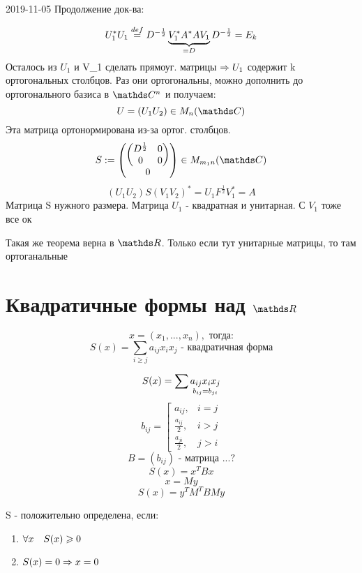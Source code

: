 \documentclass[12pt, fleqn]{article}
\begin{document}
\begin{lect}{2019-11-05}
  Продолжение док-ва:
  \begin{Proof}
    \[U_1^* U_1 \os{def}{=} D^{-\frac{1}{2}} \ub{=D}{V_1^* A^* A V_1} D^{-\frac{1}{2}} = E_k\]
    Осталось из $U_1$ и V_1 сделать прямоуг. матрицы $\Ra U_1$ содержит k ортогональных столбцов. Раз они ортогональны, можно дополнить до ортогонального базиса в $\CC^n$ и получаем:
    \[U=(U_1 U_2) \in M_n(\CC)\]
    Эта матрица ортонормирована из-за ортог. столбцов.
    \[S:=\begin{pmatrix}
    \begin{pmatrix}
      D^{\frac{1}{2}} & 0\\
      0 & 0
    \end{pmatrix}\\
    0
    \end{pmatrix} \in M_{m_1 n}(\CC)\]
    \[(U_1 U_2) S (V_1 V_2)^* = U_1 F^{\frac{1}{2}} V_1^* = A\]
    Матрица S нужного размера. Матрица $U_1$ - квадратная и унитарная. С $V_1$ тоже все ок
  \end{Proof}

  \begin{remark}
    Такая же теорема верна в $\R$. Только если тут унитарные матрицы, то там ортоганальные
  \end{remark}

  \section{Квадратичные формы над $\R$}
  \begin{Definition}
    \[x=(x_1,...,x_n),\text{ тогда:}\]
    \[S(x) = \sum_{i \geq j} a_{ij} x_i x_j \text{ - квадратичная форма}\]
  \end{Definition}

  \begin{Remark}
    \[S(x) = \sum \us{b_{ij} = b_{ji}}{a_{ij} x_i x_j}\]
    \[b_{ij} = \left[\begin{matrix}
      a_{ij}, & i=j\\
      \frac{a_{ij}}{2}, & i > j\\
      \frac{a_{ji}}{2}, & j>i
    \end{matrix}\right.\]
    \[B=(b_{ij}) \text{ - матрица ...?}\]
    \[S(x) = x^T B x\]
    \[x = My\]
    \[S(x) = y^T M^T B My\]
  \end{Remark}

  \begin{definition}
    S - положительно определена, если:
    \begin{enumerate}
      \item $\forall x \q S(x) \geq 0$
      \item $S(x) = 0 \Ra x = 0$
    \end{enumerate}
  \end{definition}


\end{lect}
\end{document}
